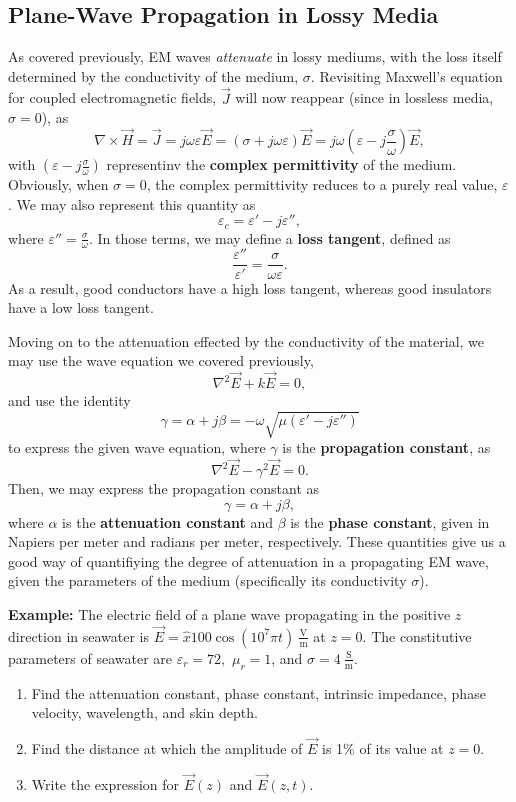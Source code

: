 \documentclass{article}
\begin{document}
		\subsection{Plane-Wave Propagation in Lossy Media}
		As covered previously, EM waves \textit{attenuate} in lossy mediums, with the loss itself determined by the conductivity of the medium, \(\sigma\). Revisiting Maxwell's equation for coupled electromagnetic fields, \(\vec{J}\) will now reappear (since in lossless media, \(\sigma = 0\)), as
		\[
		  \nabla \times \vec{H} = \vec{J} = j\omega\varepsilon \vec{E} = (\sigma + j\omega\varepsilon) \vec{E} = j\omega\left(\varepsilon - j \frac{\sigma}{\omega}\right)\vec{E},
		\]
		with \(\left(\varepsilon - j \frac{\sigma}{\omega}\right)\) representinv the \textbf{complex permittivity} of the medium. Obviously, when \(\sigma = 0\), the complex permittivity reduces to a purely real value, \(\varepsilon\). We may also represent this quantity as
		\[
		  \varepsilon_c = \varepsilon ' - j\varepsilon '',
		\]
		where \(\varepsilon ''  = \frac{\sigma}{\omega}\). In those terms, we may define a \textbf{loss tangent}, defined as
		\[
		  \frac{\varepsilon ''}{\varepsilon '} = \frac{\sigma}{\omega \varepsilon}.
		\]
		As a result, good conductors have a high loss tangent, whereas good insulators have a low loss tangent. 

		Moving on to the attenuation effected by the conductivity of the material, we may use the wave equation we covered previously, 
		\[
		  \nabla^2 \vec{E} + k \vec{E} = 0,
		\]
		and use the identity
		\[
		  \gamma = \alpha + j\beta = -\omega \sqrt{\mu(\varepsilon ' - j\varepsilon '')}
		\]
		to express the given wave equation, where \(\gamma\) is the \textbf{propagation constant}, as 
		\[
		  \nabla^2 \vec{E} - \gamma^2 \vec{E} = 0.
		\]
		Then, we may express the propagation constant as
		\[
		  \gamma = \alpha + j\beta,
		\]
		where \(\alpha\) is the \textbf{attenuation constant} and \(\beta\) is the \textbf{phase constant}, given in Napiers per meter and radians per meter, respectively. These quantities give us a good way of quantifiying the degree of attenuation in a propagating EM wave, given the parameters of the medium (specifically its conductivity \(\sigma\)).

		\textbf{Example:} The electric field of a plane wave propagating in the positive \(z\) direction in seawater is \(\vec{E} = \hat{x}100\cos{(10^7\pi t)} \ \mathrm{\frac{V}{m}}\) at \(z=0\). The constitutive parameters of seawater are \(\varepsilon_r = 72,\) \(\mu_r = 1\), and \(\sigma = 4 \ \mathrm{\frac{S}{m}}\).

		\begin{enumerate}[label=\alph*)]
			\item Find the attenuation constant, phase constant, intrinsic impedance, phase velocity, wavelength, and skin depth.
			\item Find the distance at which the amplitude of \(\vec{E}\) is 1\% of its value at \(z=0\).
			\item Write the expression for \(\vec{E}(z)\) and \(\vec{E}(z,t)\).
		\end{enumerate}
\end{document}
